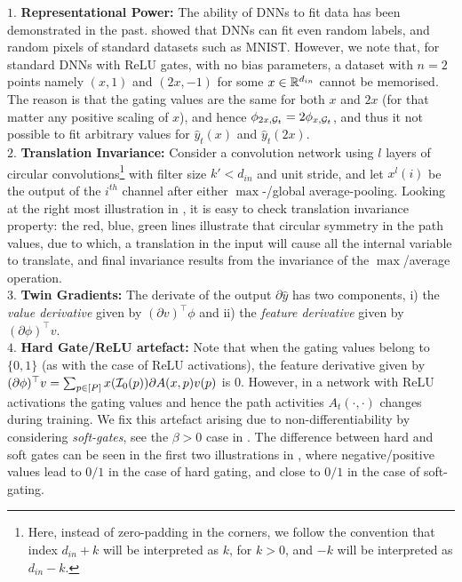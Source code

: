 $1.$ \textbf{Representational Power:} The ability of DNNs to fit data has been demonstrated in the past. \cite{ben} showed that DNNs can fit even random labels, and random pixels of standard datasets such as MNIST. However, we note that, for standard DNNs with ReLU gates, with no bias parameters, a dataset with $n=2$ points namely $(x,1)$ and $(2x,-1)$ for some $x\in \mathbb{R}^{d_{in}}$ cannot be memorised. The reason is that the gating values are the same for both $x$ and $2x$ (for that matter any positive scaling of $x$), and hence $\phi_{2x,\mathcal{G}_t }= 2\phi_{x,\mathcal{G}_t }$, and thus it not possible to fit arbitrary values for $\hat{y}_t(x)$ and $\hat{y}_t(2x)$.\\
$2.$ \textbf{Translation Invariance:} Consider a convolution network using $l$ layers of circular convolutions\footnote{Here, instead of zero-padding in the corners, we follow the convention that index $d_{in}+k$ will be interpreted as $k$, for $k>0$, and $-k$ will be interpreted as $d_{in}-k$.} with filter size $k'<d_{in}$ and unit stride, and let $x^l(i)$ be the output of the $i^{th}$ channel after either $\max$-/global average-pooling. Looking at the right most illustration in , it is easy to check translation invariance property: the red, blue, green lines illustrate that circular symmetry in the path values, due to which, a translation in the input will cause all the internal variable to translate, and final invariance results from the invariance of the $\max$/average operation.\\
$3.$ \textbf{Twin Gradients:} The derivate of the output $\partial \hat{y}$ has two components, i) the \emph{value derivative} given by $(\partial v)^\top \phi$ and ii) the \emph{feature derivative} given by $(\partial \phi)^\top v$.\\
$4.$ \textbf{Hard Gate/ReLU artefact:} Note that when the gating values belong to $\{0,1\}$ (as with the case of ReLU activations), the feature derivative given by $(\partial \phi)^\top v =\sum_{p\in[P]}x(\mathcal{I}_0(p))\partial A(x,p) v(p)$ is $0$. However, in a network with ReLU activations the gating values and hence the path activities $A_t(\cdot,\cdot)$ changes during training. We fix this artefact arising due to non-differentiability by considering \emph{soft-gates}, see the $\beta>0$ case in . The difference between hard and soft gates can be seen in the first two illustrations in , where negative/positive values lead to $0/1$ in the case of hard gating, and close to $0/1$ in the case of soft-gating.\\
